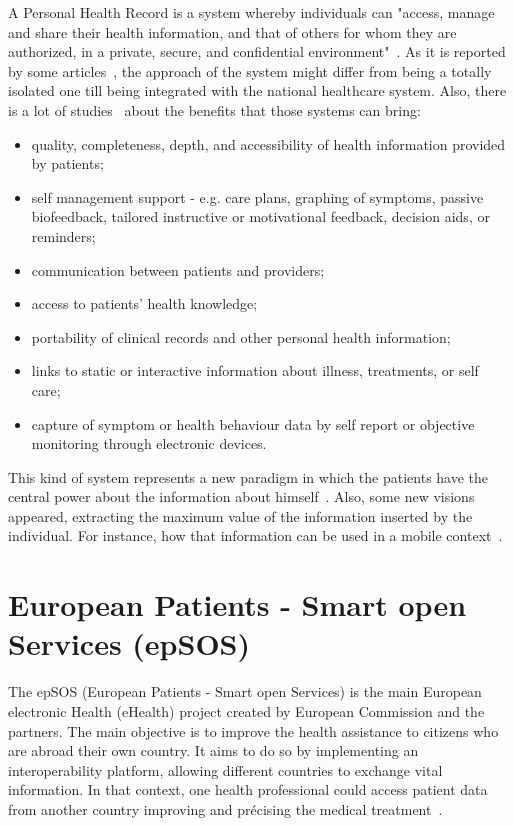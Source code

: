 A Personal Health Record is a system whereby individuals can "access, manage and share their health information, and that of others for whom they are authorized, in a private, secure, and confidential environment"~\citep{Health2003}. As it is reported by some articles~\citep{Tang2006,Tang2009}, the approach of the system might differ from being a totally isolated one till being integrated with the national healthcare system. Also, there is a lot of studies~\cite{Tang2009,Pagliari2007,Detmer2008, Fricton2008} about the benefits that those systems can bring:
\begin{itemize}
\item quality, completeness, depth, and accessibility of health information provided by patients;
\item self management support - e.g. care plans, graphing of symptoms, passive biofeedback, tailored instructive or motivational feedback, decision aids, or reminders;
\item communication between patients and providers;
\item access to patients' health knowledge;
\item portability of clinical records and other personal health information;
\item links to static or interactive information about illness, treatments, or self care;
\item capture of symptom or health behaviour data by self report or objective monitoring through electronic devices.
\end{itemize}

This kind of system represents a new paradigm in which the patients have the central power about the information about himself~\citep{Ball2007}. Also, some new visions appeared, extracting the maximum value of the information inserted by the individual. For instance, how that information can be used in a mobile context~\citep{Brief2010}.






\section{European Patients - Smart open Services (epSOS)} \label{sec:epsos}

The epSOS (European Patients - Smart open Services) is the main European electronic Health (eHealth) project created by European Commission and the partners. The main objective is to improve the health assistance to citizens who are abroad their own country. It aims to do so by implementing an interoperability platform, allowing different countries to exchange vital information. In that context, one health professional could access patient data from another country improving and précising the medical treatment~\citep{EpSOS}.


